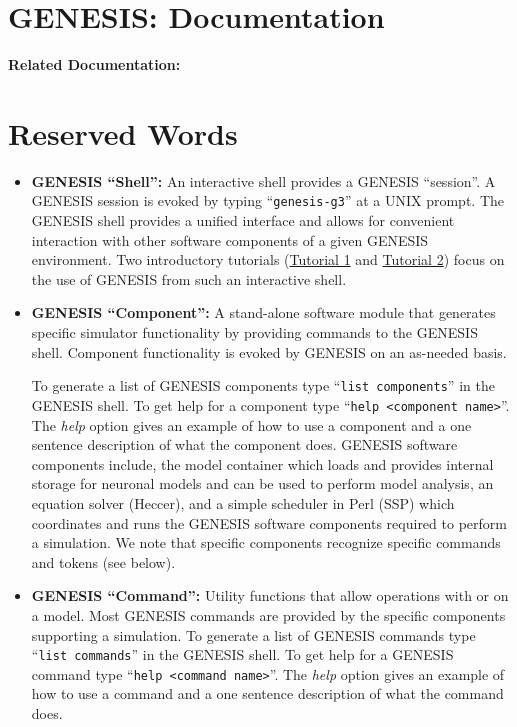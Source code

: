 \documentclass[12pt]{article}
\begin{document}
\section*{GENESIS: Documentation}

{\bf Related Documentation:}

\section*{Reserved Words}

\begin{itemize}

\item {\bf GENESIS ``Shell'':} An interactive shell provides a GENESIS ``session''. A GENESIS session is evoked by typing ``{\tt genesis-g3}'' at a UNIX prompt. The GENESIS shell provides a unified interface and allows for convenient interaction with other software components of a given GENESIS environment.  Two introductory tutorials (\href{../tutorial1/tutorial1.tex}{Tutorial 1} and \href{../tutorial2/tutorial2.tex}{Tutorial 2}) focus on the use of GENESIS from such an interactive shell.

\item {\bf GENESIS ``Component'':}  A stand-alone software module that generates specific simulator functionality by providing commands to the GENESIS shell. Component functionality is evoked by GENESIS on an as-needed basis.

To generate a list of GENESIS components type ``{\tt list components}'' in the GENESIS shell. To get help for a component type ``{\tt help <component name>}''. The {\it help} option gives an example of how to use a component and a one sentence description of what the component does. GENESIS software components include, the model container which loads and provides internal storage for neuronal models and can be used to perform model analysis, an equation solver (Heccer), and a simple scheduler in Perl (SSP) which coordinates and runs the GENESIS software components required to perform a simulation. We note that specific components recognize specific commands and tokens (see below).

\item {\bf GENESIS ``Command'':} Utility functions that allow operations with or on a model. Most GENESIS commands are provided by the specific components supporting a simulation. To generate a list of GENESIS commands type ``{\tt list commands}'' in the GENESIS shell. To get help for a GENESIS command type ``{\tt help <command name>}''. The {\it help} option gives an example of how to use a command and a one sentence description of what the command does.


\end{itemize}
\end{document}
